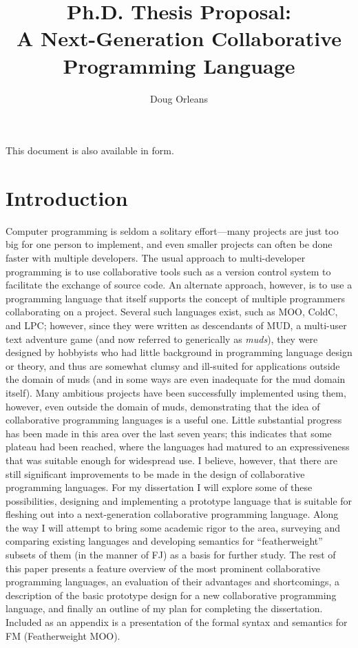 \documentclass{article}
\title{Ph.D. Thesis Proposal: \\
A Next-Generation Collaborative Programming Language}
\author{Doug Orleans}
\begin{document}
\begin{htmlonly}
This document is also available in
 form.
\end{htmlonly}

\maketitle

\tableofchildlinks

\section{Introduction}

Computer programming is seldom a solitary effort---many projects are
just too big for one person to implement, and even smaller projects
can often be done faster with multiple developers.  The usual approach
to multi-developer programming is to use collaborative tools such as a
version control system to facilitate the exchange of source code.  An
alternate approach, however, is to use a programming language that
itself supports the concept of multiple programmers collaborating on a
project.  Several such languages exist, such as MOO\cite{MOO},
ColdC\cite{ColdC}, and LPC\cite{LPC-basic}\cite{LPC-interm}; however,
since they were written as descendants of MUD\cite{MUD}, a multi-user text
adventure game (and now referred to generically as \emph{muds}), they
were designed by hobbyists who had little background in programming
language design or theory, and thus are somewhat clumsy and ill-suited
for applications outside the domain of muds (and in some ways are even
inadequate for the mud domain itself).  Many ambitious projects have
been successfully implemented using them, however, even outside the
domain of muds, demonstrating that the idea of collaborative
programming languages is a useful one.  Little substantial progress
has been made in this area over the last seven years; this indicates
that some plateau had been reached, where the languages had matured to
an expressiveness that was suitable enough for widespread use.  I
believe, however, that there are still significant improvements to be
made in the design of collaborative programming languages.  For my
dissertation I will explore some of these possibilities, designing and
implementing a prototype language that is suitable for fleshing out
into a next-generation collaborative programming language.  Along the
way I will attempt to bring some academic rigor to the area, surveying
and comparing existing languages and developing semantics for
``featherweight'' subsets of them (in the manner of FJ\cite{FJ}) as a basis
for further study.  The rest of this paper presents a feature overview
of the most prominent collaborative programming languages, an
evaluation of their advantages and shortcomings, a description of the
basic prototype design for a new collaborative programming language,
and finally an outline of my plan for completing the dissertation.
Included as an appendix is a presentation of the formal syntax and
semantics for FM (Featherweight MOO).
\end{document}

